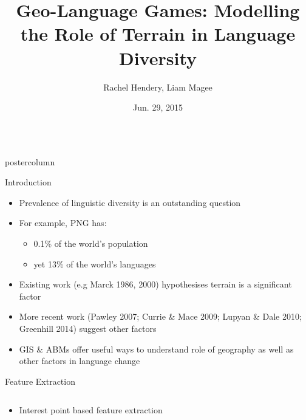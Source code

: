 \documentclass[final,hyperref={pdfpagelabels=false}]{beamer}
\title{\huge Geo-Language Games: Modelling the Role of Terrain in Language Diversity}
\author{Rachel Hendery, Liam Magee}
\institute[University of Western Sydney]{Digital Humanities Research Group, University of Western Sydney, Parramatta, Australia}
\date[Jun. 29, 2015]{Jun. 29, 2015}
\newlength{\columnheight}
\begin{document}
\begin{frame}
  \begin{columns}
    \begin{column}{.49\textwidth}
      \begin{beamercolorbox}[center,wd=\textwidth]{postercolumn}
        \begin{minipage}[T]{.95\textwidth}  %
          \parbox[t][\columnheight]{\textwidth}{ %
            \begin{block}{Introduction}
              \begin{itemize}
              \item Prevalence of linguistic diversity is an outstanding question
              \item For example, PNG has:
                \begin{itemize}
                \item 0.1\% of the world's population
                \item yet 13\% of the world's languages
                \end{itemize}
              \item Existing work (e.g Marck 1986, 2000) hypothesises terrain is a significant factor
              \item More recent work (Pawley 2007; Currie \& Mace 2009; Lupyan \& Dale 2010; Greenhill 2014) suggest other factors
              \item GIS \& ABMs offer useful ways to understand role of geography as well as other factors in language change
              \end{itemize}
            \end{block}
            \vfill
            \begin{block}{Feature Extraction}
              \begin{columns}
                \begin{column}{.55\textwidth}
                  \begin{itemize}
                  \item Interest point based feature extraction

\end{itemize}
\end{column}
\end{columns}
\end{block}}
\end{minipage}
\end{beamercolorbox}
\end{column}
\end{columns}
\end{frame}
\end{document}
